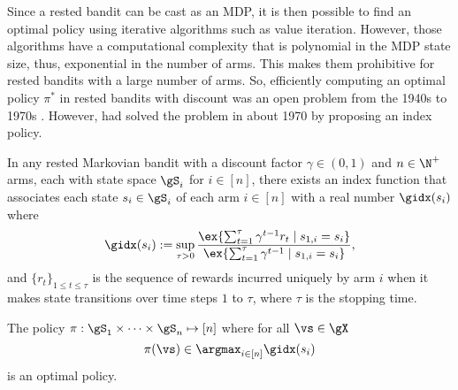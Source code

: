 Since a rested bandit can be cast as an MDP, it is then possible to find an optimal policy using iterative algorithms such as value iteration.
However, those algorithms have a computational complexity that is polynomial in the MDP state size, thus, exponential in the number of arms.
This makes them prohibitive for rested bandits with a large number of arms.
So, efficiently computing an optimal policy $\pi^*$ in rested bandits with discount was an open problem from the 1940s to 1970s \cite{whittle1996optimal}.
However, \cite{gittins1979bandit} had solved the problem in about 1970 by proposing an index policy.
\begin{prop}
    \label{ch:mb:prop:gidx_defn}
    In any rested Markovian bandit with a discount factor $\gamma\in(0,1)$ and $n\in\N^+$ arms, each with state space $\gS_i$ for $i\in[n]$, there exists an index function that associates each state $s_i\in\gS_i$ of each arm $i\in[n]$ with a real number $\gidx(s_i)$ where
    \begin{equation}
        \label{ch:mb:eq:gidx_defn}
        \gidx(s_i):=\sup_{\tau>0}\frac{\ex{\sum_{t=1}^{\tau}\gamma^{t-1}r_t \mid s_{1,i}=s_i}}{\ex{\sum_{t=1}^{\tau}\gamma^{t-1}\mid s_{1,i}=s_i}}, 
    \end{equation}
    and $\{r_t\}_{1\le t\le\tau}$ is the sequence of rewards incurred uniquely by arm $i$ when it makes state transitions over time steps $1$ to $\tau$, where $\tau$ is the stopping time.

    The policy $\pi:\gS_1\times\dots\times\gS_n\mapsto[n]$ where for all $\vs\in\gX$
    \begin{equation*}
        \pi(\vs)\in\argmax_{i\in[n]}\gidx(s_i)
    \end{equation*} is an optimal policy.
\end{prop}
